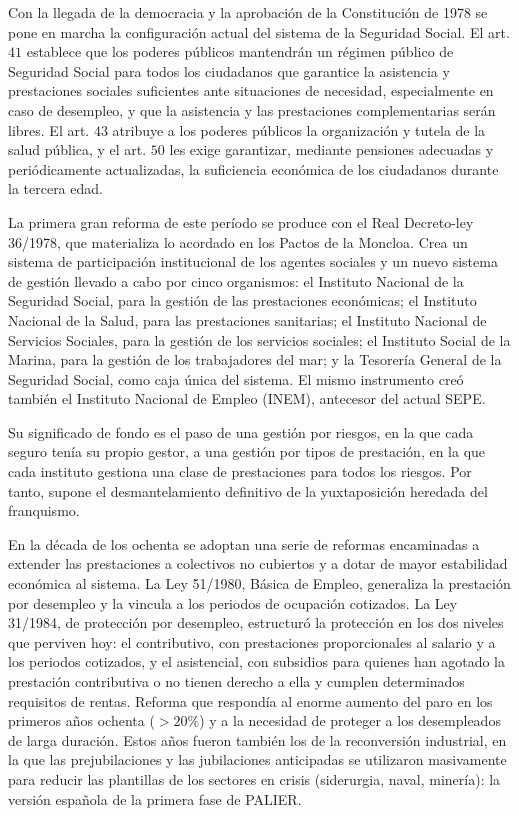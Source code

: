 \documentclass[10pt,a4paper]{article}
\begin{document}
Con la llegada de la democracia y la aprobación de la Constitución de 1978 se pone en marcha la configuración actual del sistema de la Seguridad Social. El art. $41$ establece que los poderes públicos mantendrán un régimen público de Seguridad Social para todos los ciudadanos que garantice la asistencia y prestaciones sociales suficientes ante situaciones de necesidad, especialmente en caso de desempleo, y que la asistencia y las prestaciones complementarias serán libres. El art. $43$ atribuye a los poderes públicos la organización y tutela de la salud pública, y el art. $50$ les exige garantizar, mediante pensiones adecuadas y periódicamente actualizadas, la suficiencia económica de los ciudadanos durante la tercera edad. 

La primera gran reforma de este período se produce con el Real Decreto-ley 36/1978, que materializa lo acordado en los Pactos de la Moncloa. Crea un sistema de participación institucional de los agentes sociales y un nuevo sistema de gestión llevado a cabo por cinco organismos: el Instituto Nacional de la Seguridad Social, para la gestión de las prestaciones económicas; el Instituto Nacional de la Salud, para las prestaciones sanitarias; el Instituto Nacional de Servicios Sociales, para la gestión de los servicios sociales; el Instituto Social de la Marina, para la gestión de los trabajadores del mar; y la Tesorería General de la Seguridad Social, como caja única del sistema. El mismo instrumento creó también el Instituto Nacional de Empleo (INEM), antecesor del actual SEPE.

Su significado de fondo es el paso de una gestión por riesgos, en la que cada seguro tenía su propio gestor, a una gestión por tipos de prestación, en la que cada instituto gestiona una clase de prestaciones para todos los riesgos. Por tanto, supone el desmantelamiento definitivo de la yuxtaposición heredada del franquismo. 

En la década de los ochenta se adoptan una serie de reformas encaminadas a extender las prestaciones a colectivos no cubiertos y a dotar de mayor estabilidad económica al sistema. La Ley 51/1980, Básica de Empleo, generaliza la prestación por desempleo y la vincula a los periodos de ocupación cotizados. La Ley 31/1984, de protección por desempleo, estructuró la protección en los dos niveles que perviven hoy: el contributivo, con prestaciones proporcionales al salario y a los periodos cotizados, y el asistencial, con subsidios para quienes han agotado la prestación contributiva o no tienen derecho a ella y cumplen determinados requisitos de rentas. Reforma que respondía al enorme aumento del paro en los primeros años ochenta ($>20\%$) y a la necesidad de proteger a los desempleados de larga duración. Estos años fueron también los de la reconversión industrial, en la que las prejubilaciones y las jubilaciones anticipadas se utilizaron masivamente para reducir las plantillas de los sectores en crisis (siderurgia, naval, minería): la versión española de la primera fase de PALIER.
\end{document}
